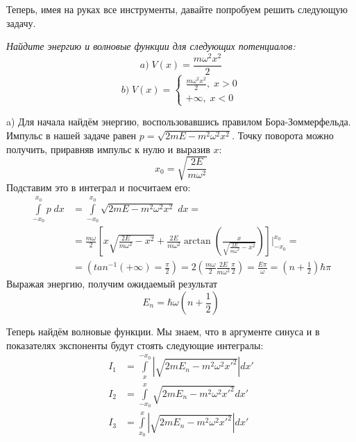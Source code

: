 Теперь, имея на руках все инструменты, давайте попробуем решить следующую задачу.

\begin{center}
    \textit{Найдите энергию и волновые функции для следующих потенциалов:}
    \[
    a)\;V(x) = \frac{m\omega^2 x^2}{2}
    \]
    \[
    b)\;V(x) = 
    \begin{cases}
     \frac{m\omega^2 x^2}{2},\;x > 0\\
    +\infty,\; x < 0
    \end{cases}
    \]
\end{center}

a) Для начала найдём энергию, воспользовавшись правилом Бора-Зоммерфельда. Импульс в нашей задаче равен $p = \sqrt{2mE - m^2\omega^2x^2}$. Точку поворота можно получить, приравняв импульс к нулю и выразив $x$:
\[
x_0 = \sqrt{\frac{2E}{m\omega^2}}
\]
Подставим это в интеграл и посчитаем его:
\begin{align*}
\int\limits_{-x_0}^{x_0}p\;dx & = \int\limits_{-x_0}^{x_0}\sqrt{2mE - m^2\omega^2x^2}\;dx =\\& = \frac{m\omega}{2}\left[x\sqrt{\frac{2E}{m\omega^2}- x^2} + \frac{2E}{m\omega^2}\arctan\left( \frac{x}{\sqrt{\frac{2E}{m\omega^2} - x^2}} \right)\right]\Bigg|_{-x_0}^{x_0} = \\ & = \left( tan^{-1}(+\infty) = \frac{\pi}{2}\right) = 2(\frac{m\omega}{2}\frac{2E}{m\omega^2}\frac{\pi}{2}) = \frac{E\pi}{\omega} = (n + \frac{1}{2})\hbar\pi
\end{align*}
Выражая энергию, получим ожидаемый результат
\[
E_n = \hbar\omega(n + \frac{1}{2})
\]

Теперь найдём волновые функции. Мы знаем, что в аргументе синуса и в показателях экспоненты будут стоять следующие интегралы:
\begin{align*}
I_1 &= \int\limits_{x}^{-x_0}|\sqrt{2mE_n - m^2\omega^2x'^2}|dx'\\
I_2 &= \int\limits_{-x_0}^{x}\sqrt{2mE_n - m^2\omega^2x'^2}dx'\\
I_3 &= \int\limits_{x_0}^{x}|\sqrt{2mE_n - m^2\omega^2x'^2}|dx'
\end{align*}

